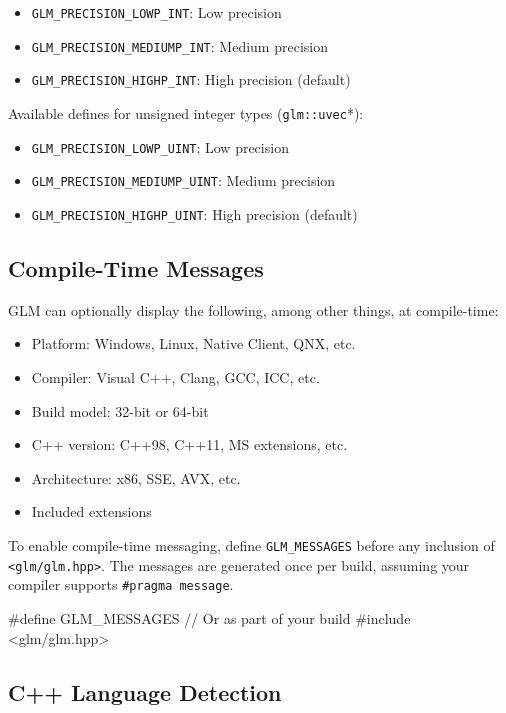 \documentclass{scrartcl}
\numberwithin{figure}{subsection}
\begin{document}
\begin{itemize}
    \item \verb|GLM_PRECISION_LOWP_INT|: Low precision
    \item \verb|GLM_PRECISION_MEDIUMP_INT|: Medium precision 
    \item \verb|GLM_PRECISION_HIGHP_INT|: High precision (default)
\end{itemize}

Available defines for unsigned integer types (\verb|glm::uvec|*):

\begin{itemize}
    \item \verb|GLM_PRECISION_LOWP_UINT|: Low precision
    \item \verb|GLM_PRECISION_MEDIUMP_UINT|: Medium precision 
    \item \verb|GLM_PRECISION_HIGHP_UINT|: High precision (default)
\end{itemize}

\subsection{Compile-Time Messages}

GLM can optionally display the following, among other things, at compile-time:

\begin{itemize}
    \item Platform: Windows, Linux, Native Client, QNX, etc. 
    \item Compiler: Visual C++, Clang, GCC, ICC, etc.
    \item Build model: 32-bit or 64-bit
    \item C++ version: C++98, C++11, MS extensions, etc.
    \item Architecture: x86, SSE, AVX, etc.
    \item Included extensions
\end{itemize}

To enable compile-time messaging, define \verb|GLM_MESSAGES| before any inclusion of \verb|<glm/glm.hpp>|. The messages are generated once per build, assuming your compiler supports \verb|#pragma message|.

\begin{cppcode}
#define GLM_MESSAGES  // Or as part of your build
#include <glm/glm.hpp>
\end{cppcode}

\subsection{C++ Language Detection}
\end{document}
